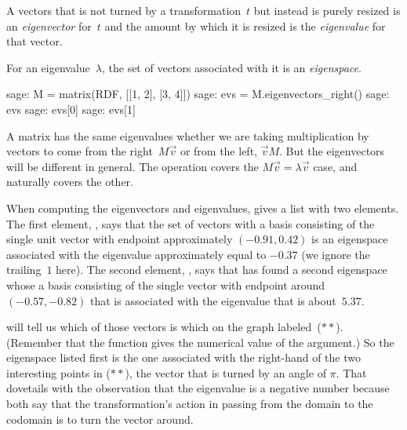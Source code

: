 A vectors that is not turned by a transformation~$t$ but instead
is purely resized 
is an \textit{eigenvector} for~$t$ and the amount by which it is 
resized is the \textit{eigenvalue} for that vector.

For an eigenvalue~$\lambda$, the set of vectors associated with
it is an \textit{eigenspace}.
\begin{sagecommandline}
sage: M = matrix(RDF, [[1, 2], [3, 4]])
sage: evs = M.eigenvectors_right()
sage: evs
sage: evs[0] 
sage: evs[1]
\end{sagecommandline}
\noindent
A matrix has the same eigenvalues whether we are taking multiplication 
by vectors to come from the 
right~$M\vec{v}$ or from the left, $\vec{v}M$.  
But the eigenvectors will be different in general. 
The \Sage{} operation  covers the 
$M\vec{v}=\lambda\vec{v}$ case, and naturally 
covers the other.

When computing the eigenvectors and eigenvalues, \Sage{} gives a list
with two elements.
The first element, , 
says that the set of vectors with a basis consisting of the single unit
vector with endpoint approximately $(-0.91, 0.42)$  is an
eigenspace associated with the eigenvalue approximately equal to $-0.37$
(we ignore the trailing~$1$ here).
The second element, , 
says that \Sage{} has found a second eigenspace
whose a basis consisting of the single vector with endpoint around
$(-0.57, -0.82)$ that is associated with the
eigenvalue that is about~$5.37$. 

\Sage{} will tell us which of those vectors is which on the graph 
labeled~($**$).
(Remember that the  function gives the numerical value of
the argument.)
So the eigenspace listed first is the one associated with the right-hand
of the two interesting points in ($**$), the vector that is turned by an angle
of $\pi$.
That dovetails with the observation that the eigenvalue is a negative number 
because both say that the transformation's action in passing from the
domain to the codomain is to turn the vector around.


